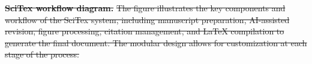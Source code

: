 \documentclass[preprint,review,12pt]{elsarticle}%
\providecommand{\DIFdeltex}[1]{{\protect\color{red}\sout{#1}}}                      %
\providecommand{\DIFdelFL}[1]{\DIFdel{#1}} %
\providecommand{\DIFdel}[1]{\texorpdfstring{\DIFdeltex{#1}}{}} %
\begin{document}
\begin{frontmatter}

{%
\textbf{\DIFdelFL{SciTex workflow diagram.}} %
\DIFdelFL{The figure illustrates the key components and workflow of the SciTex system, including manuscript preparation, AI-assisted revision, figure processing, citation management, and LaTeX compilation to generate the final document. The modular design allows for customization at each stage of the process.}}






\end{frontmatter}
\end{document}
